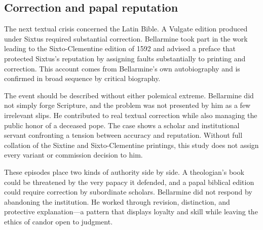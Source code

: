 \subsection{Correction and papal reputation}

The next textual crisis concerned the Latin Bible.  A Vulgate edition produced
under Sixtus required substantial correction.  Bellarmine took part in the
work leading to the Sixto-Clementine edition of 1592 and advised a preface that
protected Sixtus's reputation by assigning faults substantially to printing
and correction.  This account comes from Bellarmine's own autobiography and is
confirmed in broad sequence by critical biography.

The event should be described without either polemical extreme.  Bellarmine did
not simply forge Scripture, and the problem was not presented by him as a few
irrelevant slips.  He contributed to real textual correction while also
managing the public honor of a deceased pope.  The case shows a scholar and
institutional servant confronting a tension between accuracy and reputation.
Without full collation of the Sixtine and Sixto-Clementine printings, this
study does not assign every variant or commission decision to him.

These episodes place two kinds of authority side by side.  A theologian's book
could be threatened by the very papacy it defended, and a papal biblical
edition could require correction by subordinate scholars.  Bellarmine did not
respond by abandoning the institution.  He worked through revision,
distinction, and protective explanation---a pattern that displays loyalty and
skill while leaving the ethics of candor open to judgment.

